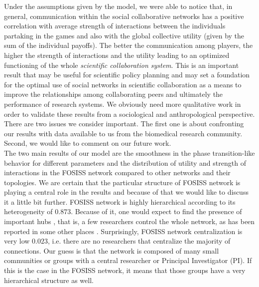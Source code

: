 \documentclass{bmcart}
\begin{document}
  Under the assumptions given by the model, we were able to
  notice that, in general, communication within the social
  collaborative networks has a positive correlation with average
  strength of interactions between the individuals partaking in the
  games and also with the global collective utility (given by the sum
  of the individual payoffs). The better the communication among
  players, the higher the strength of interactions and the utility
  leading to an optimized functioning of the whole \emph{scientific
    collaboration system}. This is an important result that may be
  useful for scientific policy planning and may set a foundation for
  the optimal use of social networks in scientific collaboration as a
  means to improve the relationships among collaborating peers and
  ultimately the performance of research systems.  We obviously need
  more qualitative work in order to validate these results from a
  sociological and anthropological perspective.\\

  
  
  There are two issues we consider important. The first one is about
  confronting our results with data available to us from the biomedical research
  community. Second, we would like to comment on our future work.\\


  The two main results of our model are the smoothness in the phase
  transition-like behavior for different parameters and the distribution of
  utility and strength of interactions in the FOSISS network compared to other
  networks and their topologies. We are certain that the particular structure of
  FOSISS network is playing a central role in the results and because of that we
  would like to discuss it a little bit further. FOSISS network is highly
  hierarchical according to its heterogeneity of $0.873$. Because of it, one
  would expect to find the presence of important hubs \cite{Wu:2008}, that is, a
  few researchers control the whole network, as has been reported in some other
  places \cite{Yousefi-etal:2008}. Surprisingly, FOSISS network centralization
  is very low $0.023$, i.e. there are no researchers that centralize the
  majority of connections. Our guess is that the network is composed of many
  small communities or groups with a central researcher or Principal
  Investigator (PI). If this is the case in the FOSISS network, it means that
  those groups have a very hierarchical structure as well.\\
\end{document}
